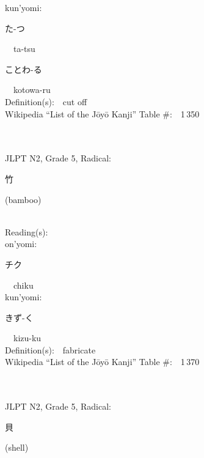 \begin{multicols}{2}
{\hspace*{1em}}kun'yomi:\ \ \\
{\hspace*{2em}}{\begin{CJK}{UTF8}{min} た-つ \end{CJK}}\ \ ta-tsu\ \ \\
{\hspace*{2em}}{\begin{CJK}{UTF8}{min} ことわ-る \end{CJK}}\ \ kotowa-ru\ \ \\
Definition(s):\ \ cut off \\
Wikipedia ``List of the J\=oy\=o Kanji'' Table \#:\ \ 1\,350 \\
\ \ \\
{\fontsize{34pt}{40pt}  }\ \ \\  %
{JLPT N2, Grade 5, Radical:\ \ {\begin{CJK}{UTF8}{min} 竹 \end{CJK}} (bamboo) } \\
Reading(s):\ \ \\
{\hspace*{1em}}on'yomi:\ \ \\
{\hspace*{2em}}{\begin{CJK}{UTF8}{min} チク \end{CJK}}\ \ chiku\ \ \\
{\hspace*{1em}}kun'yomi:\ \ \\
{\hspace*{2em}}{\begin{CJK}{UTF8}{min} きず-く \end{CJK}}\ \ kizu-ku\ \ \\
Definition(s):\ \ fabricate \\
Wikipedia ``List of the J\=oy\=o Kanji'' Table \#:\ \ 1\,370 \\
\ \ \\
{\fontsize{34pt}{40pt}  }\ \ \\  %
{JLPT N2, Grade 5, Radical:\ \ {\begin{CJK}{UTF8}{min} 貝 \end{CJK}} (shell) } \\

\end{multicols}
